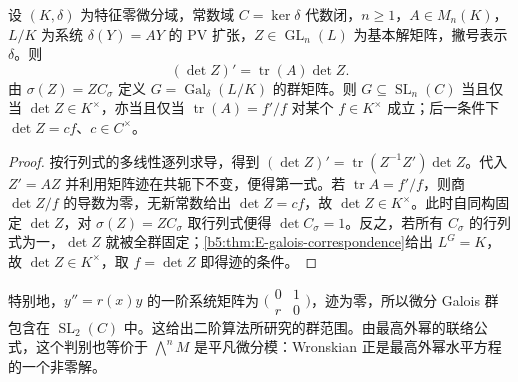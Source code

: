 \begin{proposition}[行列式方程]\label{b5:prop:E-wronskian}
	设 \((K,\delta)\) 为特征零微分域，常数域 \(C=\ker\delta\) 代数闭，\(n\ge1\)，\(A\in M_n(K)\)，\(L/K\) 为系统 \(\delta(Y)=AY\) 的 PV 扩张，\(Z\in\operatorname{GL}_n(L)\) 为基本解矩阵，撇号表示 \(\delta\)。则
	\[
		(\det Z)'=\operatorname{tr}(A)\det Z.
	\]
	由 \(\sigma(Z)=ZC_\sigma\) 定义 \(G=\operatorname{Gal}_\delta(L/K)\) 的群矩阵。则 \(G\subseteq\operatorname{SL}_n(C)\) 当且仅当 \(\det Z\in K^\times\)，亦当且仅当 \(\operatorname{tr}(A)=f'/f\) 对某个 \(f\in K^\times\) 成立；后一条件下 \(\det Z=cf\)、\(c\in C^\times\)。
\end{proposition}
\begin{proof}
	按行列式的多线性逐列求导，得到 \((\det Z)'=\operatorname{tr}(Z^{-1}Z')\det Z\)。代入 \(Z'=AZ\) 并利用矩阵迹在共轭下不变，便得第一式。若 \(\operatorname{tr}A=f'/f\)，则商 \(\det Z/f\) 的导数为零，无新常数给出 \(\det Z=cf\)，故 \(\det Z\in K^\times\)。此时自同构固定 \(\det Z\)，对 \(\sigma(Z)=ZC_\sigma\) 取行列式便得 \(\det C_\sigma=1\)。反之，若所有 \(C_\sigma\) 的行列式为一，\(\det Z\) 就被全群固定；\cref{b5:thm:E-galois-correspondence}给出 \(L^G=K\)，故 \(\det Z\in K^\times\)，取 \(f=\det Z\) 即得迹的条件。
\end{proof}

特别地，\(y''=r(x)y\) 的一阶系统矩阵为
\(\bigl(\begin{smallmatrix}0&1\\r&0\end{smallmatrix}\bigr)\)，迹为零，所以微分 Galois 群包含在 \(\operatorname{SL}_2(C)\) 中。这给出二阶算法所研究的群范围。由最高外幂的联络公式，这个判别也等价于 \(\bigwedge^nM\) 是平凡微分模：Wronskian 正是最高外幂水平方程的一个非零解。

